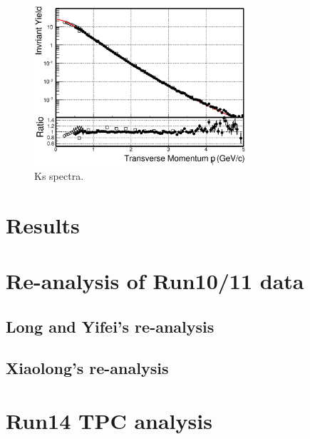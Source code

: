 \documentclass[a4paper]{article}
\begin{document}
\begin{figure}
\centering
\includegraphics[width=0.7\textwidth]{fig/Ks_spectra_PtCut_0.eps}
\caption{\label{fig:Ks_spectra}Ks spectra.}
\end{figure}

\section{\label{results}Results}

\section{\label{Run1011}Re-analysis of Run10/11 data}

\subsection{Long and Yifei's re-analysis}

\subsection{Xiaolong's re-analysis}

\section{\label{Run14TPC}Run14 TPC analysis}



\end{document}
